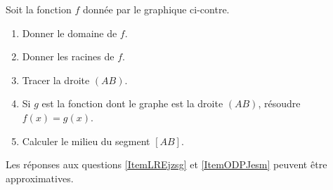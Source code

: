 
\begin{exercice}\label{exosmath-0006}

    \begin{multicols}{2}
    Soit la fonction \( f\) donnée par le graphique ci-contre.
        \begin{enumerate}
            \item
                Donner le domaine de \( f\).
            \item\label{ItemLREjzsg}
                Donner les racines de \( f\).
            \item 
                Tracer la droite \( (AB)\).
            \item\label{ItemODPJesm}
                Si \( g\) est la fonction dont le graphe est la droite \( (AB)\), résoudre \( f(x)=g(x)\).
            \item
                Calculer le milieu du segment \( [AB]\).
        \end{enumerate}


        \columnbreak


    \end{multicols}
    Les réponses aux questions \ref{ItemLREjzsg} et \ref{ItemODPJesm} peuvent être approximatives.
        

\end{exercice}
